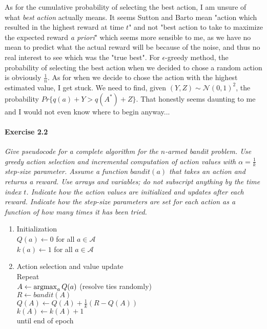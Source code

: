 As for the cumulative probability of selecting the best action, I am unsure of what \textit{best action} actually means.
It seems Sutton and Barto mean "action which resulted in the highest reward at time $t$" and not "best action to take to maximize the expected reward \textit{a priori}" which seems more sensible to me, as we have no mean to predict what the actual reward will be because of the noise, and thus no real interest to see which was the "true best".
For $\epsilon$-greedy method, the probability of selecting the best action when we decided to chose a random action is obviously $\frac{1}{n}$.
As for when we decide to chose the action with the highest estimated value, I get stuck.
We need to find, given $(Y, Z) \sim \mathcal{N}(0,1)^2$, the probability $Pr\{q(a) + Y > q(A^*) + Z\}$.
That honestly seems daunting to me and I would not even know where to begin anyway...

\paragraph{Exercise 2.2}
\textit{Give pseudocode for a complete algorithm for the $n$-armed bandit problem. Use greedy action selection and incremental computation of action values with $\alpha = \frac{1}{k}$ step-size parameter. Assume a function $\mathit{bandit}(a)$ that takes an action and returns a reward. Use arrays and variables; do not subscript anything by the time index $t$. Indicate how the action values are initialized and updates after each reward. Indicate how the step-size parameters are set for each action as a function of how many times it has been tried.}

\begin{enumerate}
\item Initialization \\
$Q(a) \leftarrow 0$ for all $a \in \mathcal{A}$ \\
$k(a) \leftarrow 1$ for all $a \in \mathcal{A}$

\item Action selection and value update \\
Repeat \\
\-\hspace{2em} $A \leftarrow \operatorname*{argmax}_a Q(a)$ (resolve ties randomly) \\
\-\hspace{2em} $R \leftarrow \mathit{bandit}(A)$ \\
\-\hspace{2em} $Q(A) \leftarrow Q(A) + \frac{1}{k} (R - Q(A))$ \\
\-\hspace{2em} $k(A) \leftarrow k(A) + 1$ \\
until end of epoch
\end{enumerate}


